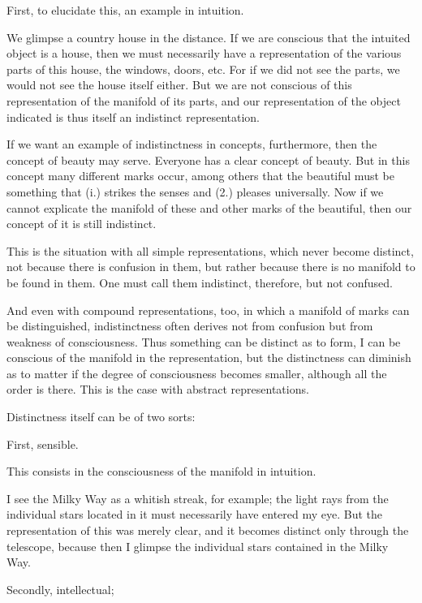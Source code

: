     First, to elucidate this, an example in intuition.

    We glimpse a country house in the distance.
    If we are conscious that the intuited object is a house,
    then we must necessarily have a representation of
    the various parts of this house, the windows, doors, etc.
    For if we did not see the parts,
    we would not see the house itself either.
    But we are not conscious of this
    representation of the manifold of its parts,
    and our representation of the object indicated is
    thus itself an indistinct representation.

    If we want an example of indistinctness in concepts, furthermore, then
    the concept of beauty may serve. Everyone has a clear concept of beauty.
    But in this concept many different marks occur, among others that the
    beautiful must be something that (i.) strikes the senses and (2.) pleases
    universally. Now if we cannot explicate the manifold of these and other
    marks of the beautiful, then our concept of it is still indistinct.

    This is the situation with all simple representations,
    which never become distinct,
    not because there is confusion in them,
    but rather because there is no manifold to be found in them.
    One must call them indistinct, therefore, but not confused.

    And even with compound representations, too, in which
    a manifold of marks can be distinguished,
    indistinctness often derives not from confusion
    but from weakness of consciousness.
    Thus something can be distinct as to form,
    I can be conscious of the manifold in the representation,
    but the distinctness can diminish as to matter if
    the degree of consciousness becomes smaller,
    although all the order is there.
    This is the case with abstract representations.

Distinctness itself can be of two sorts:

First, sensible.

This consists in the consciousness of the manifold in intuition.

    I see the Milky Way as a whitish streak, for example;
    the light rays from the individual stars located in it
    must necessarily have entered my eye.
    But the representation of this was merely clear,
    and it becomes distinct only through the telescope,
    because then I glimpse the individual stars contained in the Milky Way.

Secondly, intellectual;

